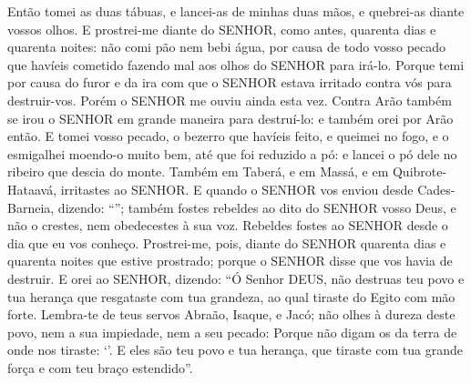 {{  Então tomei as duas tábuas, e lancei-as de minhas duas mãos, e quebrei-as diante vossos olhos.
  E prostrei-me diante do SENHOR, como antes, quarenta dias e quarenta noites: não comi pão nem bebi água, por causa de todo vosso pecado que havíeis cometido fazendo mal aos olhos do SENHOR para irá-lo.
  Porque temi por causa do furor e da ira com que o SENHOR estava irritado contra vós para destruir-vos. Porém o SENHOR me ouviu ainda esta vez.
  Contra Arão também se irou o SENHOR em grande maneira para destruí-lo: e também orei por Arão então.
  E tomei vosso pecado, o bezerro que havíeis feito, e queimei no fogo, e o esmigalhei moendo-o muito bem, até que foi reduzido a pó: e lancei o pó dele no ribeiro que descia do monte.
  Também em Taberá, e em Massá, e em Quibrote-Hataavá, irritastes ao SENHOR.
  E quando o SENHOR vos enviou desde Cades-Barneia, dizendo: \enquote{}; também fostes rebeldes ao dito do SENHOR vosso Deus, e não o crestes, nem obedecestes à sua voz.
  Rebeldes fostes ao SENHOR desde o dia que eu vos conheço.
  Prostrei-me, pois, diante do SENHOR quarenta dias e quarenta noites que estive prostrado; porque o SENHOR disse que vos havia de destruir.
  E orei ao SENHOR, dizendo: \enquote{Ó Senhor DEUS, não destruas teu povo e tua herança que resgataste com tua grandeza, ao qual tiraste do Egito com mão forte.
  Lembra-te de teus servos Abraão, Isaque, e Jacó; não olhes à dureza deste povo, nem a sua impiedade, nem a seu pecado:
  Porque não digam os da terra de onde nos tiraste: \enquote{}.
  E eles são teu povo e tua herança, que tiraste com tua grande força e com teu braço estendido}}.
\par }


